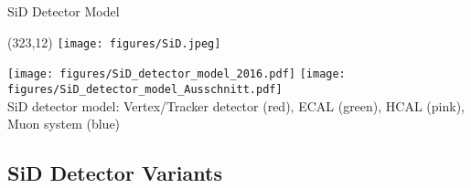 \documentclass[xcolor={dvipsnames}]{beamer}
\newcommand{\sidlogo}{
  \setlength{\TPHorizModule}{1pt}
  \setlength{\TPVertModule}{1pt}
  \begin{textblock}{1}(323,12)
   \texttt{[image: figures/SiD.jpeg]}
  \end{textblock}
  }
\begin{document}
\begin{frame}{SiD Detector Model} 
\sidlogo
\texttt{[image: figures/SiD\_detector\_model\_2016.pdf]}
\texttt{[image: figures/SiD\_detector\_model\_Ausschnitt.pdf]}\\
SiD detector model: Vertex/Tracker detector (red), ECAL (green), HCAL (pink), Muon system (blue)
\end{frame}



\subsection{SiD Detector Variants}
\end{document}
